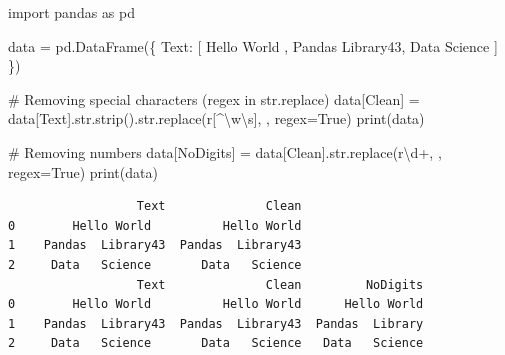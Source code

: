 \documentclass[
  english,
  letterpaper,
  DIV=11,
  numbers=noendperiod]{scrreprt}
\newenvironment{Shaded}{\begin{snugshade}}{\end{snugshade}}
\newcommand{\BuiltInTok}[1]{\textcolor[rgb]{0.00,0.23,0.31}{#1}}
\newcommand{\CommentTok}[1]{\textcolor[rgb]{0.37,0.37,0.37}{#1}}
\newcommand{\DecValTok}[1]{\textcolor[rgb]{0.68,0.00,0.00}{#1}}
\newcommand{\ImportTok}[1]{\textcolor[rgb]{0.00,0.46,0.62}{#1}}
\newcommand{\NormalTok}[1]{\textcolor[rgb]{0.00,0.23,0.31}{#1}}
\newcommand{\OperatorTok}[1]{\textcolor[rgb]{0.37,0.37,0.37}{#1}}
\newcommand{\PreprocessorTok}[1]{\textcolor[rgb]{0.68,0.00,0.00}{#1}}
\newcommand{\StringTok}[1]{\textcolor[rgb]{0.13,0.47,0.30}{#1}}
\newcommand{\VariableTok}[1]{\textcolor[rgb]{0.07,0.07,0.07}{#1}}
\newcommand{\VerbatimStringTok}[1]{\textcolor[rgb]{0.13,0.47,0.30}{#1}}
\begin{document}
\begin{Shaded}
\begin{Highlighting}[]
\ImportTok{import}\NormalTok{ pandas }\ImportTok{as}\NormalTok{ pd}

\NormalTok{data }\OperatorTok{=}\NormalTok{ pd.DataFrame(\{}
    \StringTok{\textquotesingle{}Text\textquotesingle{}}\NormalTok{: [}\StringTok{\textquotesingle{}  Hello World  \textquotesingle{}}\NormalTok{, }\StringTok{\textquotesingle{}Pandas  Library43\textquotesingle{}}\NormalTok{, }\StringTok{\textquotesingle{}   Data   Science  \textquotesingle{}}\NormalTok{]}
\NormalTok{\})}

\CommentTok{\# Removing special characters (regex in str.replace)}
\NormalTok{data[}\StringTok{\textquotesingle{}Clean\textquotesingle{}}\NormalTok{] }\OperatorTok{=}\NormalTok{ data[}\StringTok{\textquotesingle{}Text\textquotesingle{}}\NormalTok{].}\BuiltInTok{str}\NormalTok{.strip().}\BuiltInTok{str}\NormalTok{.replace(}\VerbatimStringTok{r\textquotesingle{}}\PreprocessorTok{[\^{}}\DecValTok{\textbackslash{}w\textbackslash{}s}\PreprocessorTok{]}\VerbatimStringTok{\textquotesingle{}}\NormalTok{, }\StringTok{\textquotesingle{}\textquotesingle{}}\NormalTok{, regex}\OperatorTok{=}\VariableTok{True}\NormalTok{)}
\BuiltInTok{print}\NormalTok{(data)}

\CommentTok{\# Removing numbers}
\NormalTok{data[}\StringTok{\textquotesingle{}NoDigits\textquotesingle{}}\NormalTok{] }\OperatorTok{=}\NormalTok{ data[}\StringTok{\textquotesingle{}Clean\textquotesingle{}}\NormalTok{].}\BuiltInTok{str}\NormalTok{.replace(}\VerbatimStringTok{r\textquotesingle{}}\DecValTok{\textbackslash{}d}\OperatorTok{+}\VerbatimStringTok{\textquotesingle{}}\NormalTok{, }\StringTok{\textquotesingle{}\textquotesingle{}}\NormalTok{, regex}\OperatorTok{=}\VariableTok{True}\NormalTok{)}
\BuiltInTok{print}\NormalTok{(data)}
\end{Highlighting}
\end{Shaded}

\begin{verbatim}
                  Text              Clean
0        Hello World          Hello World
1    Pandas  Library43  Pandas  Library43
2     Data   Science       Data   Science
                  Text              Clean         NoDigits
0        Hello World          Hello World      Hello World
1    Pandas  Library43  Pandas  Library43  Pandas  Library
2     Data   Science       Data   Science   Data   Science
\end{verbatim}
\end{document}
